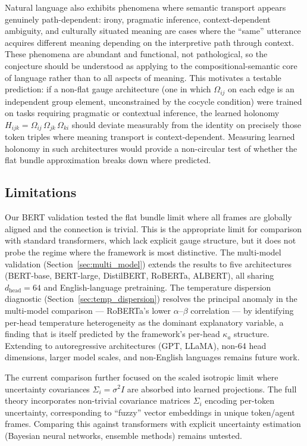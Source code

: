 \documentclass[twoside,11pt]{article}
\begin{document}
Natural language also exhibits phenomena where semantic transport appears genuinely path-dependent: irony, pragmatic inference, context-dependent ambiguity, and culturally situated meaning are cases where the ``same'' utterance acquires different meaning depending on the interpretive path through context. These phenomena are abundant and functional, not pathological, so the conjecture should be understood as applying to the compositional-semantic core of language rather than to all aspects of meaning. This motivates a testable prediction: if a non-flat gauge architecture (one in which $\Omega_{ij}$ on each edge is an independent group element, unconstrained by the cocycle condition) were trained on tasks requiring pragmatic or contextual inference, the learned holonomy $H_{ijk} = \Omega_{ij}\,\Omega_{jk}\,\Omega_{ki}$ should deviate measurably from the identity on precisely those token triples where meaning transport is context-dependent. Measuring learned holonomy in such architectures would provide a non-circular test of whether the flat bundle approximation breaks down where predicted.

\subsection{Limitations}

Our BERT validation tested the flat bundle limit where all frames are globally aligned and the connection is trivial. This is the appropriate limit for comparison with standard transformers, which lack explicit gauge structure, but it does not probe the regime where the framework is most distinctive. The multi-model validation (Section~\ref{sec:multi_model}) extends the results to five architectures (BERT-base, BERT-large, DistilBERT, RoBERTa, ALBERT), all sharing $d_{\text{head}} = 64$ and English-language pretraining. The temperature dispersion diagnostic (Section~\ref{sec:temp_dispersion}) resolves the principal anomaly in the multi-model comparison --- RoBERTa's lower $\alpha$--$\beta$ correlation --- by identifying per-head temperature heterogeneity as the dominant explanatory variable, a finding that is itself predicted by the framework's per-head $\kappa_a$ structure. Extending to autoregressive architectures (GPT, LLaMA), non-64 head dimensions, larger model scales, and non-English languages remains future work.

The current comparison further focused on the scaled isotropic limit where uncertainty covariances $\Sigma_i = \sigma^2 I$ are absorbed into learned projections. The full theory incorporates non-trivial covariance matrices $\Sigma_i$ encoding per-token uncertainty, corresponding to ``fuzzy'' vector embeddings in unique token/agent frames. Comparing this against transformers with explicit uncertainty estimation (Bayesian neural networks, ensemble methods) remains untested.
\end{document}
